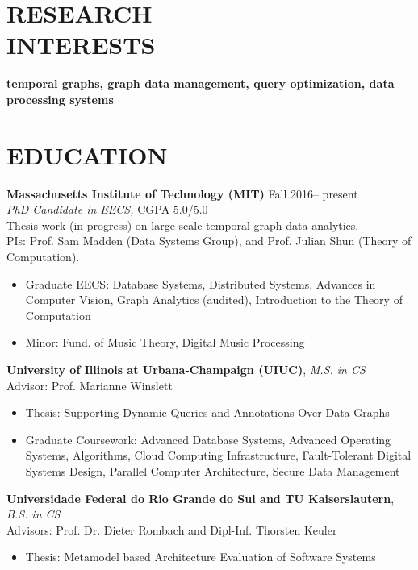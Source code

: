 \documentclass[centered,overlapped]{res}
\begin{document}

\address{jmf@csail.mit.edu, \url{http://joana.fyi}}

\begin{resume}

\section{RESEARCH \\ INTERESTS} \textbf{temporal graphs, graph data management, query optimization, data processing systems}

\section{EDUCATION} \textbf{Massachusetts Institute of Technology (MIT)} \hfill Fall 2016-- present \\
  {\sl PhD Candidate in EECS,} CGPA 5.0/5.0 \\
  Thesis work (in-progress) on large-scale temporal graph data analytics.\\
  PIs: Prof. Sam Madden (Data Systems Group), and Prof. Julian Shun (Theory of Computation).
  \begin{itemize}  \itemsep -2pt
  \item Graduate EECS: Database Systems, Distributed Systems, Advances in Computer Vision, Graph Analytics (audited), Introduction to the Theory of Computation
  \item Minor: Fund. of Music Theory, Digital Music Processing
  \end{itemize}

  \textbf{University of Illinois at Urbana-Champaign (UIUC)}, {\sl M.S. in CS} \\ %
  Advisor: Prof. Marianne Winslett
  \begin{itemize}  \itemsep -2pt
  \item Thesis: Supporting Dynamic Queries and Annotations Over Data Graphs
  \item Graduate Coursework: Advanced Database Systems, Advanced Operating Systems, Algorithms, Cloud Computing Infrastructure, Fault-Tolerant Digital Systems Design, Parallel Computer Architecture, Secure Data Management
  \end{itemize}

  \textbf{Universidade Federal do Rio Grande do Sul and TU Kaiserslautern}, {\sl B.S. in CS} \\ %
  Advisors: Prof. Dr. Dieter Rombach and Dipl-Inf. Thorsten Keuler
  \begin{itemize}  \itemsep -2pt
  \item Thesis: Metamodel based Architecture Evaluation of Software Systems
  \end{itemize}


\end{resume}
\end{document}
